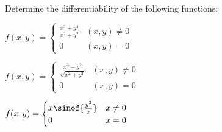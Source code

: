 \documentclass[10pt]{article}
\begin{document}
\begin{exercise*}

    Determine the differentiability of the following functions:
    \benum
        \item $\displaystyle f(x,y)=\begin{cases}\frac{x^3+y^4}{x^2+y^2} & (x,y)\neq0 \\ 0 & (x,y)=0\end{cases}$
        \item $\displaystyle f(x,y)=\begin{cases}\frac{x^3-y^2}{\sqrt{x^2+y^2}} & (x,y)\neq0 \\ 0 & (x,y)=0\end{cases}$
        \item $\displaystyle f(x,y)=\begin{cases}x\sinof{\frac{y^2}x} & x\neq0 \\ 0 & x=0\end{cases}$ 
    \eenum

\end{exercise*}
\end{document}
